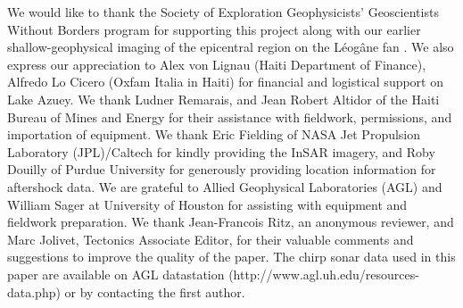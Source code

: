 \documentclass[linenumbers,draft]{agujournal}
\begin{document}
\acknowledgments
We would like to thank the Society of Exploration Geophysicists' Geoscientists Without Borders program for supporting this project along with our earlier shallow-geophysical imaging of the epicentral region on the L\'eog\^ane fan \citep{kocel2016near}. We also express our appreciation to Alex von Lignau (Haiti Department of Finance), Alfredo Lo Cicero (Oxfam Italia in Haiti) for financial and logistical support on Lake Azuey. We thank Ludner Remarais, and Jean Robert Altidor of the Haiti Bureau of Mines and Energy for their assistance with fieldwork, permissions, and importation of equipment. We thank Eric Fielding of NASA Jet Propulsion Laboratory (JPL)/Caltech for kindly providing the InSAR imagery, and Roby Douilly of Purdue University for generously providing location information for aftershock data. We are grateful to Allied Geophysical Laboratories (AGL) and William Sager at University of Houston for assisting with equipment and fieldwork preparation. We thank Jean-Francois Ritz, an anonymous reviewer, and Marc Jolivet, Tectonics Associate Editor, for their valuable comments and suggestions to improve the quality of the paper. The chirp sonar data used in this paper are available on AGL datastation (http://www.agl.uh.edu/resources-data.php) or by contacting the first author. 

\clearpage



\clearpage
\end{document}
